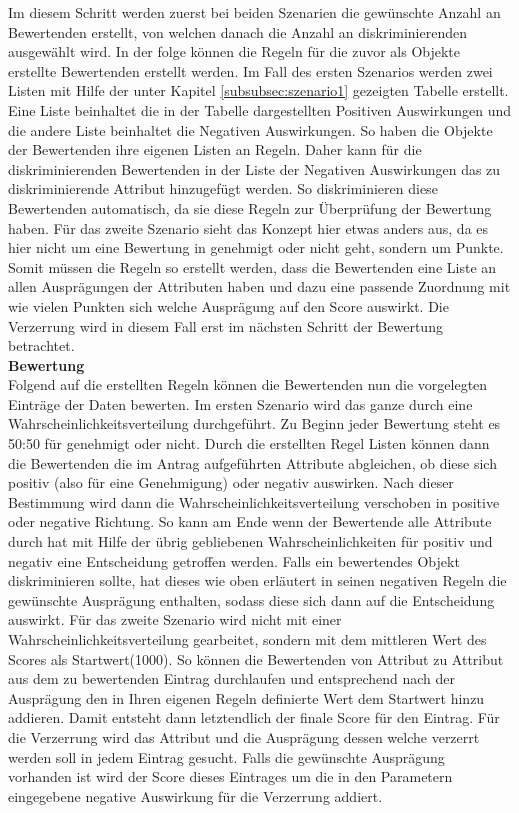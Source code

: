 \begin{onehalfspace}
Im diesem Schritt werden zuerst bei beiden Szenarien die gewünschte Anzahl an Bewertenden erstellt, von welchen danach die Anzahl an diskriminierenden ausgewählt wird. In der folge können die Regeln für die zuvor als Objekte erstellte Bewertenden erstellt werden. Im Fall des ersten Szenarios werden zwei Listen mit Hilfe der unter Kapitel \ref{subsubsec:szenario1} gezeigten Tabelle erstellt. Eine Liste beinhaltet die in der Tabelle dargestellten Positiven Auswirkungen und die andere Liste beinhaltet die Negativen Auswirkungen. So haben die Objekte der Bewertenden ihre eigenen Listen an Regeln. Daher kann für die diskriminierenden Bewertenden in der Liste der Negativen Auswirkungen das zu diskriminierende Attribut hinzugefügt werden. So diskriminieren diese Bewertenden automatisch, da sie diese Regeln zur Überprüfung der Bewertung haben. Für das zweite Szenario sieht das Konzept hier etwas anders aus, da es hier nicht um eine Bewertung in genehmigt oder nicht geht, sondern um Punkte. Somit müssen die Regeln so erstellt werden, dass die Bewertenden eine Liste an allen Ausprägungen der Attributen haben und dazu eine passende Zuordnung mit wie vielen Punkten sich welche Ausprägung auf den Score auswirkt. Die Verzerrung wird in diesem Fall erst im nächsten Schritt der Bewertung betrachtet.\\
\textbf{Bewertung}\\
Folgend auf die erstellten Regeln können die Bewertenden nun die vorgelegten Einträge der Daten bewerten. Im ersten Szenario wird das ganze durch eine Wahrscheinlichkeitsverteilung durchgeführt. Zu Beginn jeder Bewertung steht es 50:50 für genehmigt oder nicht. Durch die erstellten Regel Listen können dann die Bewertenden die im Antrag aufgeführten Attribute abgleichen, ob diese sich positiv (also für eine Genehmigung) oder negativ auswirken. Nach dieser Bestimmung wird dann die Wahrscheinlichkeitsverteilung verschoben in positive oder negative Richtung. So kann am Ende wenn der Bewertende alle Attribute durch hat mit Hilfe der übrig gebliebenen Wahrscheinlichkeiten für positiv und negativ eine Entscheidung getroffen werden. Falls ein bewertendes Objekt diskriminieren sollte, hat dieses wie oben erläutert in seinen negativen Regeln die gewünschte Ausprägung enthalten, sodass diese sich dann auf die Entscheidung auswirkt. Für das zweite Szenario wird nicht mit einer Wahrscheinlichkeitsverteilung gearbeitet, sondern mit dem mittleren Wert des Scores als Startwert(1000). So können die Bewertenden von Attribut zu Attribut aus dem zu bewertenden Eintrag durchlaufen und entsprechend nach der Ausprägung den in Ihren eigenen Regeln definierte Wert dem Startwert hinzu addieren. Damit entsteht dann letztendlich der finale Score für den Eintrag. Für die Verzerrung wird das Attribut und die Ausprägung dessen welche verzerrt werden soll in jedem Eintrag gesucht. Falls die gewünschte Ausprägung vorhanden ist wird der Score dieses Eintrages um die in den Parametern eingegebene negative Auswirkung für die Verzerrung addiert.\\

\end{onehalfspace}
